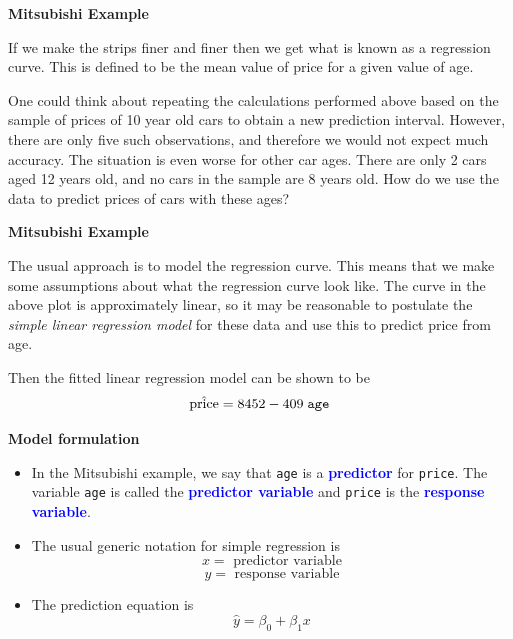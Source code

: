 \documentclass[landscape]{slides}
\newcommand{\heading}[1]{%
  \begin{center}
    \large\bf \color{red}
        #1
  \end{center}
  \vspace{1ex minus 1ex}}
\begin{document}
\begin{slide}
\heading{Mitsubishi Example}

If we make the strips finer and finer then we get what is known as a regression
curve. This is defined to be the mean value of price for a given value of age.

One could think about repeating the calculations performed above based on 
the sample of prices of 10 year old cars to obtain a new prediction interval.
However, there are only five such observations, and therefore we would not
expect much accuracy. The situation is even worse for other car ages. There are
only 2 cars aged 12 years old, and no cars in the sample are 8 years old. How
do we use the data to predict prices of cars with these ages?

\end{slide}
\begin{slide}
\heading{Mitsubishi Example}

The usual approach is to model the regression curve. This means that we make 
some assumptions about what the regression curve look like. The curve in the 
above plot is approximately linear, so it may be reasonable to postulate the
{\it simple linear regression model} for these data and use this to predict
price from age.

Then the fitted linear regression model can be shown to be
$$\hat{\mbox{price}}=8452-409 \; {\tt age}$$

\end{slide}
\begin{slide}
\heading{Model formulation}
\begin{itemize}
\item In the Mitsubishi example, we say that {\tt age} is a \textcolor{blue}{\bf predictor} for 
{\tt price}. The variable {\tt age} is called the \textcolor{blue}{\bf predictor variable} and
{\tt price} is the \textcolor{blue}{\bf response variable}.

\item The usual generic notation for simple regression is
$$x=\mbox{ predictor variable}$$
$$y=\mbox{ response variable}$$

\item The prediction equation is
%
$$\hat{y}=\beta_0+\beta_1 x$$
\end{itemize}
\end{slide}
\end{document}
